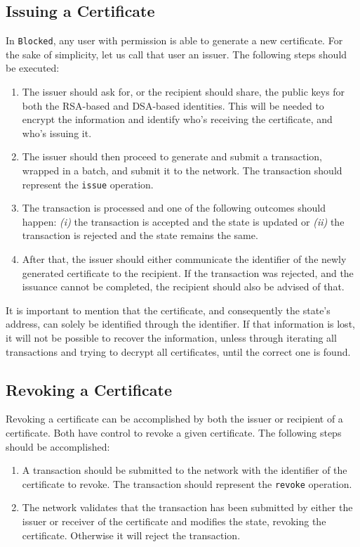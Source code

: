 \subsection{Issuing a Certificate}

In \texttt{Blocked}, any user with permission is able to generate a new certificate. For the sake of simplicity, let us call that user an issuer. The following steps should be executed:

\begin{enumerate}
	\item The issuer should ask for, or the recipient should share, the public keys for both the RSA-based and DSA-based identities. This will be needed to encrypt the information and identify who's receiving the certificate, and who's issuing it.
	\item The issuer should then proceed to generate and submit a transaction, wrapped in a batch, and submit it to the network. The transaction should represent the \texttt{issue} operation.
	\item The transaction is processed and one of the following outcomes should happen: \emph{(i)} the transaction is accepted and the state is updated or \emph{(ii)} the transaction is rejected and the state remains the same.
	\item After that, the issuer should either communicate the identifier of the newly generated certificate to the recipient. If the transaction was rejected, and the issuance cannot be completed, the recipient should also be advised of that.
\end{enumerate}

It is important to mention that the certificate, and consequently the state's address, can solely be identified through the identifier. If that information is lost, it will not be possible to recover the information, unless through iterating all transactions and trying to decrypt all certificates, until the correct one is found.

\subsection{Revoking a Certificate}

Revoking a certificate can be accomplished by both the issuer or recipient of a certificate. Both have control to revoke a given certificate. The following steps should be accomplished:

\begin{enumerate}
	\item A transaction should be submitted to the network with the identifier of the certificate to revoke. The transaction should represent the \texttt{revoke} operation.
	\item The network validates that the transaction has been submitted by either the issuer or receiver of the certificate and modifies the state, revoking the certificate. Otherwise it will reject the transaction.
\end{enumerate}

